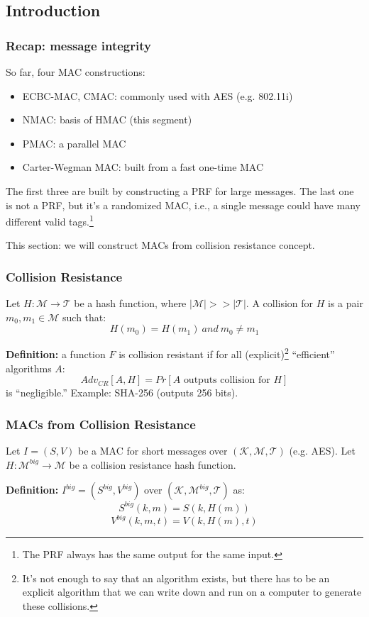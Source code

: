 \documentclass[12pt]{book}
\newcommand{\Def}{\textcolor{dkgreen}{\textbf{Definition:}} }
\begin{document}
\subsection{Introduction}
\subsubsection{Recap: message integrity}
So far, four MAC constructions:
\begin{itemize}
	\item ECBC-MAC, CMAC: commonly used with AES (e.g. 802.11i)
	\item NMAC: basis of HMAC (this segment)
	\item PMAC: a parallel MAC
	\item Carter-Wegman MAC: built from a fast one-time MAC
\end{itemize}The first three are built by constructing a PRF for large messages. The last one is not a PRF, but it's a randomized MAC, i.e., a single message could have many different valid tags.\footnote{The PRF always has the same output for the same input.}

This section: we will construct MACs from collision resistance concept.

\subsubsection{Collision Resistance}
Let $H:\mathcal{M}\rightarrow\mathcal{T}$ be a hash function, where $|\mathcal{M}|>>|\mathcal{T}|$. A collision for $H$ is a pair $m_{0},m_{1}\in\mathcal{M}$ such that:
$$H(m_{0})=H(m_{1})\ and\ m_{0}\neq m_{1}$$

\Def a function $F$ is collision resistant if for all (explicit)\footnote{It's not enough to say that an algorithm exists, but there has to be an explicit algorithm that we can write down and run on a computer to generate these collisions.} ``efficient'' algorithms $A$:
$$Adv_{CR}[A,H]=Pr[A\text{ outputs collision for }H]$$is ``negligible.''
Example: SHA-256 (outputs 256 bits).

\subsubsection{MACs from Collision Resistance}
Let $I=(S,V)$ be a MAC for short messages over $(\mathcal{K,M,T})$ (e.g. AES). Let $H:\mathcal{M}^{big}\rightarrow\mathcal{M}$ be a collision resistance hash function.

\Def $I^{big}=(S^{big},V^{big})$ over $(\mathcal{K},\mathcal{M}^{big},\mathcal{T})$ as:
$$S^{big}(k,m)=S(k,H(m))$$
$$V^{big}(k,m,t)=V(k,H(m),t)$$
\end{document}
